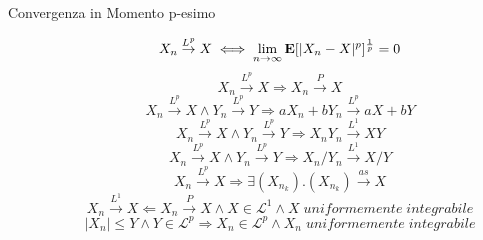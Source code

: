 \begin{description}
	\item[Convergenza in Momento p-esimo]
		\begin{equation}
		X_{n}\overset{L^{p}}{\rightarrow}X
		\iff
		\lim_{n\rightarrow\infty}\mathbf{E}[|X_{n}-X|^{p}]^{\frac{1}{p}} = 0
		\end{equation}
		\begin{equation}
		X_{n}\overset{L^{p}}{\rightarrow}X
		\Rightarrow
		X_{n}\overset{P}{\rightarrow}X
		\end{equation}
		\begin{equation}
		X_{n}\overset{L^{p}}{\rightarrow}X \land Y_{n}\overset{L^{p}}{\rightarrow}Y
		\Rightarrow
		aX_{n}+bY_{n}\overset{L^{p}}{\rightarrow}aX+bY
		\end{equation}
		\begin{equation}
		X_{n}\overset{L^{p}}{\rightarrow}X \land Y_{n}\overset{L^{p}}{\rightarrow}Y
		\Rightarrow
		X_{n}Y_{n}\overset{L^{1}}{\rightarrow}XY
		\end{equation}
		\begin{equation}
		X_{n}\overset{L^{p}}{\rightarrow}X \land Y_{n}\overset{L^{p}}{\rightarrow}Y
		\Rightarrow
		X_{n}/Y_{n}\overset{L^{1}}{\rightarrow}X/Y
		\end{equation}
		\begin{equation}
		X_{n}\overset{L^{p}}{\rightarrow}X
		\Rightarrow
		\exists (X_{n_{k}}).(X_{n_{k}})\overset{as}{\rightarrow}X
		\end{equation}
		\begin{equation}
		X_{n}\overset{L^{1}}{\rightarrow}X
		\Leftarrow
		X_{n}\overset{P}{\rightarrow}X
		\land
		X\in\mathcal{L}^{1}
		\land
		X\;uniformemente\;integrabile
		\end{equation}
		\begin{equation}
		|X_{n}|\leq Y \land Y\in\mathcal{L}^{p}
		\Rightarrow
		X_{n}\in\mathcal{L}^{p}
		\land
		X_{n}\;uniformemente\;integrabile
		\end{equation}
	
\end{description}